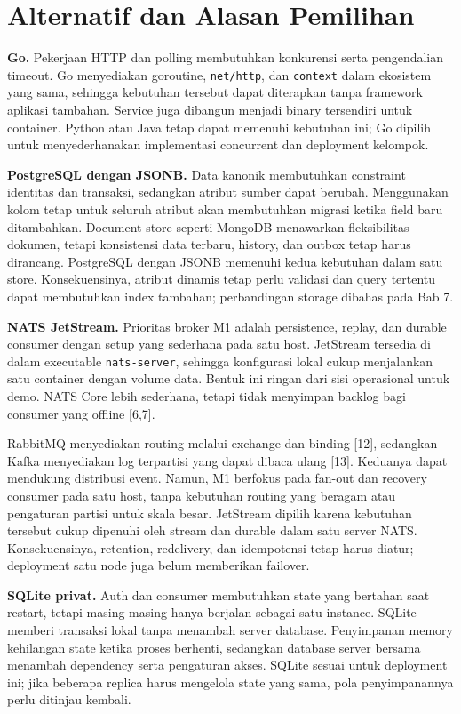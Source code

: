 \section{Alternatif dan Alasan Pemilihan}
\textbf{Go.} Pekerjaan HTTP dan polling membutuhkan konkurensi serta pengendalian timeout. Go menyediakan goroutine, \texttt{net/http}, dan \texttt{context} dalam ekosistem yang sama, sehingga kebutuhan tersebut dapat diterapkan tanpa framework aplikasi tambahan. Service juga dibangun menjadi binary tersendiri untuk container. Python atau Java tetap dapat memenuhi kebutuhan ini; Go dipilih untuk menyederhanakan implementasi concurrent dan deployment kelompok.

\textbf{PostgreSQL dengan JSONB.} Data kanonik membutuhkan constraint identitas dan transaksi, sedangkan atribut sumber dapat berubah. Menggunakan kolom tetap untuk seluruh atribut akan membutuhkan migrasi ketika field baru ditambahkan. Document store seperti MongoDB menawarkan fleksibilitas dokumen, tetapi konsistensi data terbaru, history, dan outbox tetap harus dirancang. PostgreSQL dengan JSONB memenuhi kedua kebutuhan dalam satu store. Konsekuensinya, atribut dinamis tetap perlu validasi dan query tertentu dapat membutuhkan index tambahan; perbandingan storage dibahas pada Bab 7.

\textbf{NATS JetStream.} Prioritas broker M1 adalah persistence, replay, dan durable consumer dengan setup yang sederhana pada satu host. JetStream tersedia di dalam executable \texttt{nats-server}, sehingga konfigurasi lokal cukup menjalankan satu container dengan volume data. Bentuk ini ringan dari sisi operasional untuk demo. NATS Core lebih sederhana, tetapi tidak menyimpan backlog bagi consumer yang offline [6,7].

RabbitMQ menyediakan routing melalui exchange dan binding [12], sedangkan Kafka menyediakan log terpartisi yang dapat dibaca ulang [13]. Keduanya dapat mendukung distribusi event. Namun, M1 berfokus pada fan-out dan recovery consumer pada satu host, tanpa kebutuhan routing yang beragam atau pengaturan partisi untuk skala besar. JetStream dipilih karena kebutuhan tersebut cukup dipenuhi oleh stream dan durable dalam satu server NATS. Konsekuensinya, retention, redelivery, dan idempotensi tetap harus diatur; deployment satu node juga belum memberikan failover.

\textbf{SQLite privat.} Auth dan consumer membutuhkan state yang bertahan saat restart, tetapi masing-masing hanya berjalan sebagai satu instance. SQLite memberi transaksi lokal tanpa menambah server database. Penyimpanan memory kehilangan state ketika proses berhenti, sedangkan database server bersama menambah dependency serta pengaturan akses. SQLite sesuai untuk deployment ini; jika beberapa replica harus mengelola state yang sama, pola penyimpanannya perlu ditinjau kembali.

